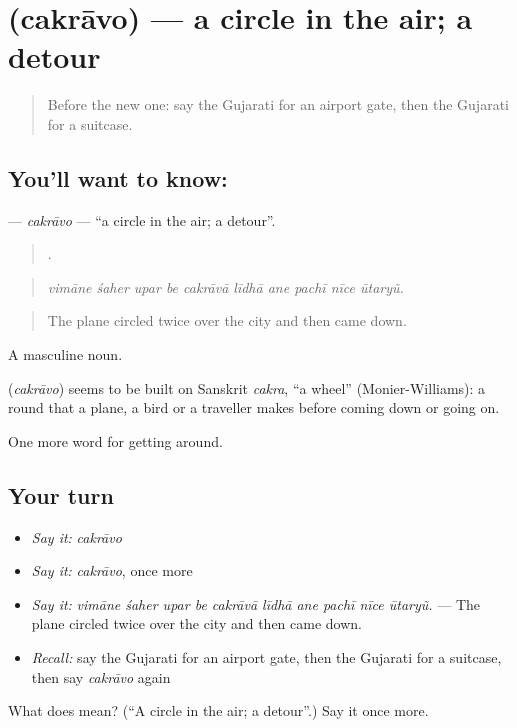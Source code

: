 \section[\texorpdfstring{\gu{ચકરાવો} (cakrāvo)}{ચકરાવો (cakrāvo)}]{ (cakrāvo) — a circle in the air; a detour}

\label{lesson:GU-C405-cakravo}



\begin{quote}
Before the new one: say the Gujarati for an airport gate, then the Gujarati for a suitcase.
\end{quote}

\subsection*{You'll want to know: }
\textbf{} — \emph{cakrāvo} — \textquotedblleft{}a circle in the air; a detour\textquotedblright{}.

\begin{quote}
         .
\end{quote}

\begin{quote}
\emph{vimāne śaher upar be cakrāvā līdhā ane pachī nīce ūtaryũ.}
\end{quote}

\begin{quote}
The plane circled twice over the city and then came down.
\end{quote}

A masculine noun.

\begin{cousinweb}
\textbf{} (\emph{cakrāvo}) seems to be built on Sanskrit \emph{cakra}, \textquotedblleft{}a wheel\textquotedblright{} (Monier-Williams): a round that a plane, a bird or a traveller makes before coming down or going on.
\end{cousinweb}

\begin{grammarlens}[title={What you've built}]
One more word for getting around.
\end{grammarlens}

\subsection*{Your turn}
\begin{itemize}
\raggedright
  \item \emph{Say it:} \emph{cakrāvo}
  \item \emph{Say it:} \emph{cakrāvo}, once more
  \item \emph{Say it:} \emph{vimāne śaher upar be cakrāvā līdhā ane pachī nīce ūtaryũ.} — The plane circled twice over the city and then came down.
  \item \emph{Recall:} say the Gujarati for an airport gate, then the Gujarati for a suitcase, then say \emph{cakrāvo} again
\end{itemize}

\begin{tcolorbox}[breakable,colback=teal!4,colframe=teal!35!black,title={Before you move on}]
What does  mean? (\textquotedblleft{}A circle in the air; a detour\textquotedblright{}.) Say it once more.
\end{tcolorbox}

